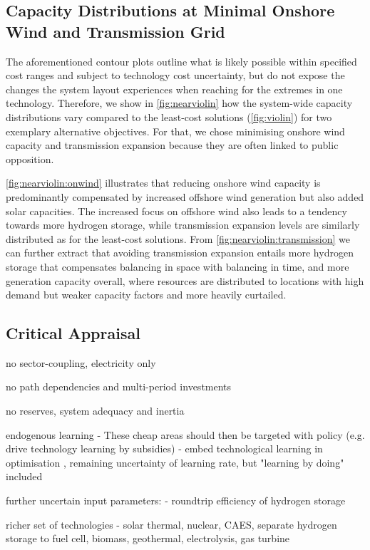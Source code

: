 \subsection{Capacity Distributions at Minimal Onshore Wind and Transmission Grid}

The aforementioned contour plots  outline
what is likely possible within specified cost ranges and subject to technology cost uncertainty,
but do not expose
the changes the system layout experiences when reaching for the extremes in one technology.
Therefore, we show in \cref{fig:nearviolin} how the system-wide capacity distributions vary 
compared to the least-cost solutions (\cref{fig:violin}) for two exemplary alternative objectives.
For that, we chose minimising onshore wind capacity and transmission expansion
because they are often linked to public opposition.

\cref{fig:nearviolin:onwind} illustrates that reducing onshore wind capacity is
predominantly compensated by increased offshore wind generation but also added solar capacities.
The increased focus on offshore wind also leads to a tendency towards more hydrogen storage,
while transmission expansion levels are similarly distributed as for the least-cost solutions.
From \cref{fig:nearviolin:transmission} we can further extract that avoiding transmission expansion entails
more hydrogen storage that compensates balancing in space with balancing in time,
and more generation capacity overall, where resources are distributed to locations with
high demand but weaker capacity factors and more heavily curtailed.

\subsection{Critical Appraisal}

no sector-coupling, electricity only

no path dependencies and multi-period investments

no reserves, system adequacy and inertia

endogenous learning
- These cheap areas should then be targeted with policy (e.g. drive technology learning by subsidies)
- embed technological learning in optimisation \cite{heuberger_power_2017} \cite{lopion_cost_2019}, remaining uncertainty of learning rate, but "learning by doing" included

further uncertain input parameters:
- roundtrip efficiency of hydrogen storage

richer set of technologies
- solar thermal, nuclear, CAES, separate hydrogen storage to fuel cell, biomass, geothermal, electrolysis, gas turbine
